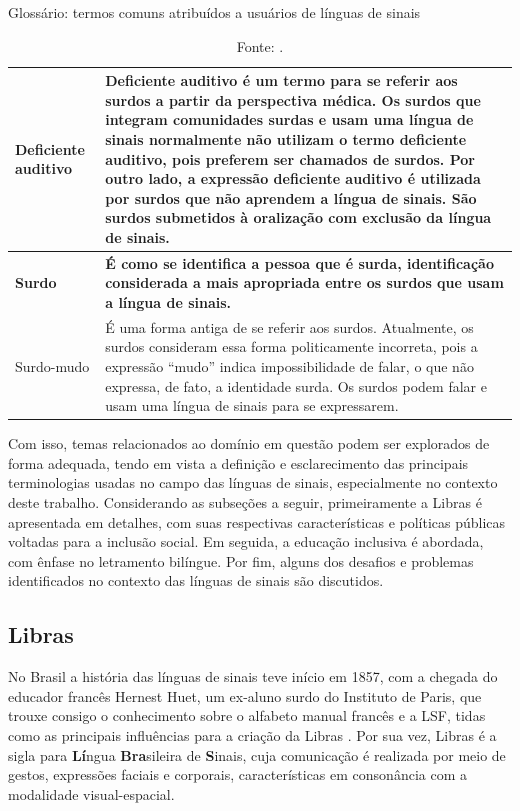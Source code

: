 \begin{table}[htbp]
\caption{Glossário: termos comuns atribuídos a usuários de línguas de sinais}
\label{tab:glossario:termos-usuarios}
\begin{tabularx}{\textwidth}{l|X} \hline
Deficiente auditivo & Deficiente auditivo é um termo para se referir aos surdos a partir da perspectiva médica. Os surdos que integram comunidades surdas e usam uma língua de sinais normalmente não utilizam o termo deficiente auditivo, pois preferem ser chamados de surdos. Por outro lado, a expressão deficiente auditivo é utilizada por surdos que não aprendem a língua de sinais. São surdos submetidos à oralização com exclusão da língua de sinais. \\ \hline
\textbf{Surdo} & \textbf{É como se identifica a pessoa que é surda, identificação considerada a mais apropriada entre os surdos que usam a língua de sinais.} \\ \hline
Surdo-mudo & É uma forma antiga de se referir aos surdos. Atualmente, os surdos consideram essa forma politicamente incorreta, pois a expressão ``mudo'' indica impossibilidade de falar, o que não expressa, de fato, a identidade surda. Os surdos podem falar e usam uma língua de sinais para se expressarem. \\ \hline
\end{tabularx}
\caption*{Fonte: .}
\end{table}

Com isso, temas relacionados ao domínio em questão podem ser explorados de forma adequada, tendo em vista a definição e esclarecimento das principais terminologias usadas no campo das línguas de sinais, especialmente no contexto deste trabalho. Considerando as subseções a seguir, primeiramente a Libras é apresentada em detalhes, com suas respectivas características e políticas públicas voltadas para a inclusão social. Em seguida, a educação inclusiva é abordada, com ênfase no letramento bilíngue. Por fim, alguns dos desafios e problemas identificados no contexto das línguas de sinais são discutidos.

\subsection{Libras}
\label{fundamentacao-teorica:linguas-sinais:libras}

No Brasil a história das línguas de sinais teve início em 1857, com a chegada do educador francês Hernest Huet, um ex-aluno surdo do Instituto de Paris, que trouxe consigo o conhecimento sobre o alfabeto manual francês e a LSF, tidas como as principais influências para a criação da Libras \cite{Honora2017,Almeida2015}. Por sua vez, Libras é a sigla para \textbf{Lí}ngua \textbf{Bra}sileira de \textbf{S}inais, cuja comunicação é realizada por meio de gestos, expressões faciais e corporais, características em consonância com a modalidade visual-espacial.

